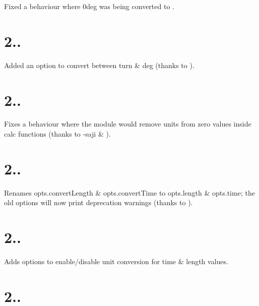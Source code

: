 \begin{DoxyItemize}
\item Fixed a behaviour where {\ttfamily 0deg} was being converted to {}.
\end{DoxyItemize}

\section*{2..}


\begin{DoxyItemize}
\item Added an option to convert between {\ttfamily turn} \& {\ttfamily deg} (thanks to ).
\end{DoxyItemize}

\section*{2..}


\begin{DoxyItemize}
\item Fixes a behaviour where the module would remove units from zero values inside calc functions (thanks to -\/saji \& ).
\end{DoxyItemize}

\section*{2..}


\begin{DoxyItemize}
\item Renames {\ttfamily opts.\+convert\+Length} \& {\ttfamily opts.\+convert\+Time} to {\ttfamily opts.\+length} \& {\ttfamily opts.\+time}; the old options will now print deprecation warnings (thanks to ).
\end{DoxyItemize}

\section*{2..}


\begin{DoxyItemize}
\item Adds options to enable/disable unit conversion for time \& length values.
\end{DoxyItemize}

\section*{2..}


